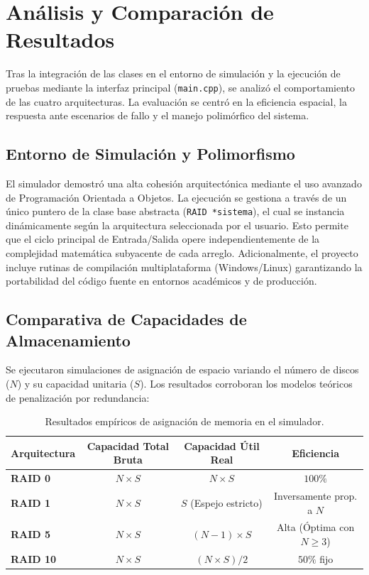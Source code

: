 \documentclass[12pt, a4paper]{article}
\begin{document}
\section{Análisis y Comparación de Resultados}

Tras la integración de las clases en el entorno de simulación y la ejecución de pruebas mediante la interfaz principal (\texttt{main.cpp}), se analizó el comportamiento de las cuatro arquitecturas. La evaluación se centró en la eficiencia espacial, la respuesta ante escenarios de fallo y el manejo polimórfico del sistema.

\subsection{Entorno de Simulación y Polimorfismo}
El simulador demostró una alta cohesión arquitectónica mediante el uso avanzado de Programación Orientada a Objetos. La ejecución se gestiona a través de un único puntero de la clase base abstracta (\texttt{RAID *sistema}), el cual se instancia dinámicamente según la arquitectura seleccionada por el usuario. Esto permite que el ciclo principal de Entrada/Salida opere independientemente de la complejidad matemática subyacente de cada arreglo. Adicionalmente, el proyecto incluye rutinas de compilación multiplataforma (Windows/Linux) garantizando la portabilidad del código fuente en entornos académicos y de producción.

\subsection{Comparativa de Capacidades de Almacenamiento}
Se ejecutaron simulaciones de asignación de espacio variando el número de discos ($N$) y su capacidad unitaria ($S$). Los resultados corroboran los modelos teóricos de penalización por redundancia:

\begin{table}[H]
    \centering
    \begin{tabular}{@{}lccc@{}}
        \toprule
        \textbf{Arquitectura} & \textbf{Capacidad Total Bruta} & \textbf{Capacidad Útil Real} & \textbf{Eficiencia} \\ \midrule
        \textbf{RAID 0}  & $N \times S$ & $N \times S$ & $100\%$ \\
        \textbf{RAID 1}  & $N \times S$ & $S$ (Espejo estricto) & Inversamente prop. a $N$ \\
        \textbf{RAID 5}  & $N \times S$ & $(N - 1) \times S$ & Alta (Óptima con $N \ge 3$) \\
        \textbf{RAID 10} & $N \times S$ & $(N \times S) / 2$ & $50\%$ fijo \\ \bottomrule
    \end{tabular}
    \caption{Resultados empíricos de asignación de memoria en el simulador.}
    \label{tab:capacidades}
\end{table}
\end{document}
